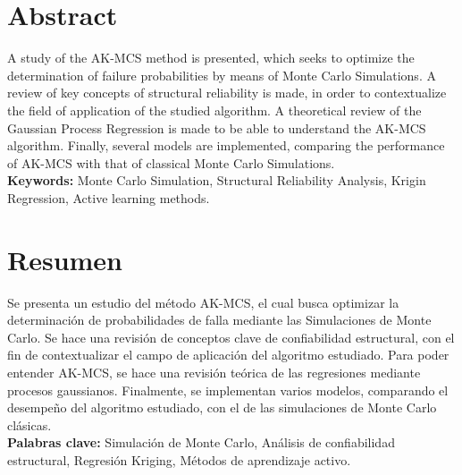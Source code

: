 \cleardoublepage
\chapter*{Abstract} %
A study of the AK-MCS method is presented, which seeks to optimize the determination of failure probabilities by means of Monte Carlo Simulations. A review of key concepts of structural reliability is made, in order to contextualize the field of application of the studied algorithm. A theoretical review of the Gaussian Process Regression is made to be able to understand the AK-MCS algorithm. Finally, several models are implemented, comparing the performance of AK-MCS with that of classical Monte Carlo Simulations. \\

\textbf{Keywords:} Monte Carlo Simulation, Structural Reliability Analysis, Krigin Regression, Active learning methods.

\cleardoublepage
\chapter*{Resumen} %
Se presenta un estudio del método AK-MCS, el cual busca optimizar la determinación de probabilidades de falla mediante las Simulaciones de Monte Carlo. Se hace una revisión de conceptos clave de confiabilidad estructural, con el fin de contextualizar el campo de aplicación del algoritmo estudiado. Para poder entender AK-MCS, se hace una revisión teórica de las regresiones mediante procesos gaussianos. Finalmente, se implementan varios modelos, comparando el desempeño del algoritmo estudiado, con el de las simulaciones de Monte Carlo clásicas. \\

 \textbf{Palabras clave:} Simulación de Monte Carlo, Análisis de confiabilidad estructural, Regresión Kriging, Métodos de aprendizaje activo.